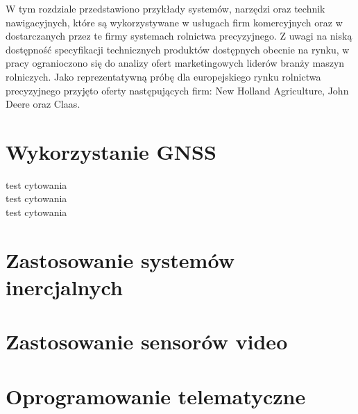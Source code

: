 W tym rozdziale przedstawiono przykłady systemów, narzędzi oraz technik nawigacyjnych, które są wykorzystywane w usługach firm komercyjnych 
oraz w dostarczanych przez te firmy systemach rolnictwa precyzyjnego. Z uwagi na niską dostępność specyfikacji technicznych produktów 
dostępnych obecnie na rynku, w pracy ogranioczono się do analizy ofert marketingowych liderów branży maszyn rolniczych.
Jako reprezentatywną próbę dla europejskiego rynku rolnictwa precyzyjnego przyjęto oferty następujących firm: New Holland Agriculture,
John Deere oraz Claas. 
\section{Wykorzystanie GNSS}
 test cytowania \cite{CLAAS_stearing_systems}\\
	test cytowania \cite{JOHN_DEERE_solutions}\\
	test cytowania \cite{NEW_HOLLAND_PLM}
\section{Zastosowanie systemów inercjalnych}

\section{Zastosowanie sensorów video}

\section{Oprogramowanie telematyczne}
